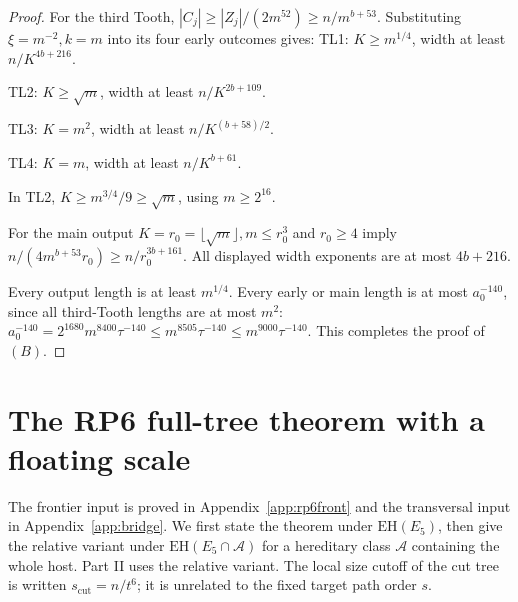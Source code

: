\documentclass[11pt,a4paper]{article}
\theoremstyle{definition}
\theoremstyle{remark}
\numberwithin{equation}{section}
\newcommand{\EH}{\mathrm{EH}}
\begin{document}
\begin{proof}
For the third Tooth, \(|C_{j}|\ge\allowbreak |Z_{j}|/(2m^{52})\ge\allowbreak n/m^{b+53}\). Substituting \(\xi=m^{-2},\allowbreak k=m\) into its four early outcomes gives:
\noindent TL1: \(K\ge\allowbreak m^{1/4}\), width at least \(n/K^{4b+216}\).\par
\noindent TL2: \(K\ge\allowbreak \sqrt{m}\), width at least \(n/K^{2b+109}\).\par
\noindent TL3: \(K=m^{2}\), width at least \(n/K^{(b+58)/2}\).\par
\noindent TL4: \(K=m\), width at least \(n/K^{b+61}\).\par
In TL2, \(K\ge\allowbreak m^{3/4}/9\ge\allowbreak \sqrt{m}\), using \(m\ge\allowbreak 2^{16}\).

For the main output \(K=r_{0}=\lfloor \sqrt{m}\rfloor,\allowbreak  m\le\allowbreak r_{0}^{3}\) and \(r_{0}\ge\allowbreak 4\) imply \(n/(4m^{b+53} r_{0}) \ge\allowbreak  n/r_{0}^{3b+161}\). All displayed width exponents are at most \(4b+216\).

Every output length is at least \(m^{1/4}\). Every early or main length is at most \(a_{0}^{-140}\), since all third-Tooth lengths are at most \(m^{2}\): \(a_{0}^{-140} = 2^{1680} m^{8400} \tau^{-140} \le\allowbreak  m^{8505} \tau^{-140} \le\allowbreak  m^{9000} \tau^{-140}\). This completes the proof of \((B)\).
\end{proof}

\section{The RP6 full-tree theorem with a floating scale}\label{app:rp6}

The frontier input is proved in Appendix~\ref{app:rp6front} and the transversal input in Appendix~\ref{app:bridge}. We first state the theorem under \(\EH(E_5)\), then give the relative variant under \(\EH(E_5\cap\mathcal A)\) for a hereditary class \(\mathcal A\) containing the whole host. Part II uses the relative variant. The local size cutoff of the cut tree is written \(s_{\mathrm{cut}}=n/t^6\); it is unrelated to the fixed target path order \(s\).
\end{document}
